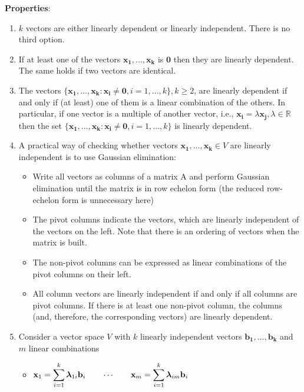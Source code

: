 \vspace{0.3cm}
\noindent\textbf{Properties}:
\begin{enumerate}
    \item $k$ vectors are either linearly dependent or linearly independent. There is no third option.

    \item If at least one of the vectors $\mathbf{x_1, ..., x_k}$ is $\mathbf{0}$ then they are linearly dependent. The same holds if two vectors are identical.

    \item The vectors $\{\mathbf{x_1, ..., x_k} : \mathbf{x_i} \neq \mathbf{0}, i = 1, ..., k\}, k \geq 2$, are linearly dependent if and only if (at least) one of them is a linear combination of the others. In particular, if one vector is a multiple of another vector, i.e., $\mathbf{x_i} = \lambda\mathbf{x_j} , \lambda \in \mathbb{R}$ then the set $\{\mathbf{x_1, ..., x_k} : \mathbf{x_i} \neq \mathbf{0}, i = 1, ..., k\}$ is linearly dependent.

    \item A practical way of checking whether vectors $\mathbf{x_1, ..., x_k} \in V$ are linearly independent is to use Gaussian elimination: 
    \begin{itemize}
        \item Write all vectors as columns of a matrix A and perform Gaussian elimination until the matrix is in row echelon form (the reduced row-echelon form is unnecessary here)
        
        \item The pivot columns indicate the vectors, which are linearly independent of the vectors on the left. Note that there is an ordering of vectors when the matrix is built.

        \item The non-pivot columns can be expressed as linear combinations of the pivot columns on their left.

        \item All column vectors are linearly independent if and only if all columns are pivot columns. If there is at least one non-pivot column, the columns (and, therefore, the corresponding vectors) are linearly dependent.
    \end{itemize}

    \item Consider a vector space $V$ with $k$ linearly independent vectors $\mathbf{b_1, ..., b_k}$ and $m$ linear combinations
    \begin{itemize}
        \item \( \displaystyle \mathbf{x}_1 \notag = \sum_{i=1}^{k} \bm{\lambda}_{1i} \mathbf{b}_i  \quad\quad\cdots\quad\quad \mathbf{x}_m = \sum_{i=1}^{k} \bm{\lambda}_{im} \mathbf{b}_i \)


\end{itemize}
\end{enumerate}
